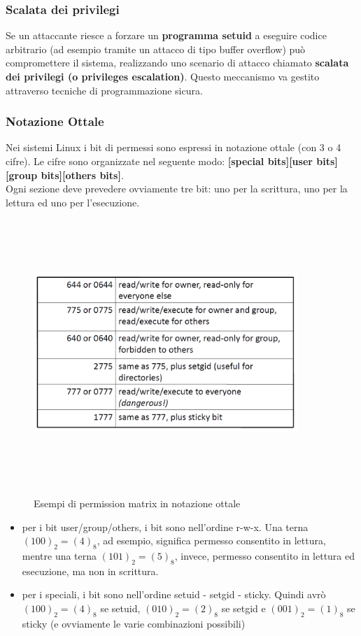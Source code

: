 \subsubsection{Scalata dei privilegi}
Se un attaccante riesce a forzare un \textbf{programma setuid} a eseguire codice arbitrario (ad esempio tramite un attacco di tipo buffer overflow) può compromettere il sistema, realizzando uno scenario di attacco chiamato \textbf{scalata dei privilegi (o privileges escalation)}. Questo meccanismo va gestito attraverso tecniche di programmazione sicura.

\subsubsection{Notazione Ottale}
Nei sistemi Linux i bit di permessi sono espressi in notazione ottale (con 3 o 4 cifre). Le cifre sono organizzate nel seguente modo: \newline
\textbf{[special bits][user bits][group bits][others bits]}. \\
Ogni sezione deve prevedere ovviamente tre bit: uno per la scrittura, uno per la lettura ed uno per l'esecuzione. 

\begin{figure}[htbp]
	\centering%
	\subfigure%
	{\includegraphics[height=10cm, width=10cm, keepaspectratio]{Immagini/sistemi_operativi/notazione_ottale.png}}
	\caption{Esempi di permission matrix in notazione ottale\label{fig:notazione_ottale}} 	
\end{figure}
\begin{itemize}
  \item per i bit user/group/others, i bit sono nell'ordine r-w-x. Una terna $(100)_{2} = (4)_{8}$, ad esempio, significa permesso consentito in lettura, mentre una terna $(101)_{2} = (5)_{8}$, invece, permesso consentito in lettura ed esecuzione, ma non in scrittura.
  \item per i speciali, i bit sono nell'ordine setuid - setgid - sticky. Quindi avrò $(100)_{2} = (4)_{8}$ se setuid, $(010)_{2} = (2)_{8}$ se setgid e $(001)_{2} = (1)_{8}$ se sticky (e ovviamente le varie combinazioni possibili)
\end{itemize}

